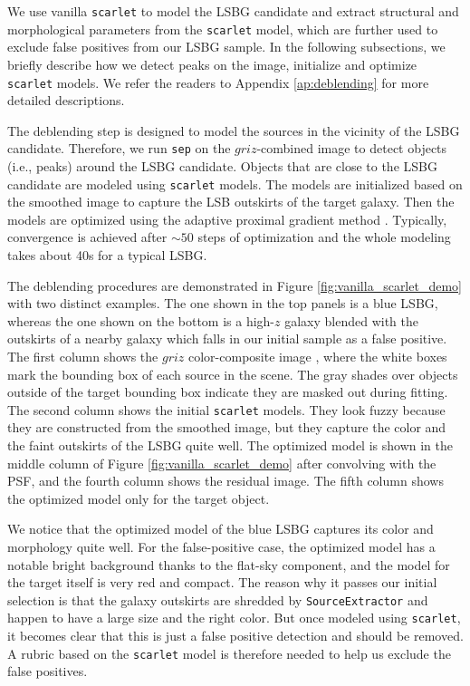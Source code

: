 \documentclass[twocolumn,astrosymb,twocolappendix]{aastex631}
\newcommand{\code}[1]{\texttt{#1}}
\begin{document}
\begin{CJK*}{UTF8}{gbsn}
We use vanilla \code{scarlet} to model the LSBG candidate and extract structural and morphological parameters from the \code{scarlet} model, which are further used to exclude false positives from our LSBG sample. In the following subsections, we briefly describe how we detect peaks on the image, initialize and optimize \code{scarlet} models. We refer the readers to Appendix \ref{ap:deblending} for more detailed descriptions. 

The deblending step is designed to model the sources in the vicinity of the LSBG candidate. Therefore, we run \code{sep} on the $griz$-combined image to detect objects (i.e., peaks) around the LSBG candidate. Objects that are close to the LSBG candidate are modeled using \code{scarlet} models. The models are initialized based on the smoothed image to capture the LSB outskirts of the target galaxy. Then the models are optimized using the adaptive proximal gradient method \citep{Melchior2019}. Typically, convergence is achieved after $\sim 50$ steps of optimization and the whole modeling takes about 40s for a typical LSBG.

The deblending procedures are demonstrated in Figure \ref{fig:vanilla_scarlet_demo} with two distinct examples. The one shown in the top panels is a blue LSBG, whereas the one shown on the bottom is a high-$z$ galaxy blended with the outskirts of a nearby galaxy which falls in our initial sample as a false positive. The first column shows the $griz$ color-composite image \citep{Lupton2004}, where the white boxes mark the bounding box of each source in the scene. The gray shades over objects outside of the target bounding box indicate they are masked out during fitting. The second column shows the initial \code{scarlet} models. They look fuzzy because they are constructed from the smoothed image, but they capture the color and the faint outskirts of the LSBG quite well. The optimized model is shown in the middle column of Figure \ref{fig:vanilla_scarlet_demo} after convolving with the PSF, and the fourth column shows the residual image. The fifth column shows the optimized model only for the target object. 

We notice that the optimized model of the blue LSBG captures its color and morphology quite well. For the false-positive case, the optimized model has a notable bright background thanks to the flat-sky component, and the model for the target itself is very red and compact. The reason why it passes our initial selection is that the galaxy outskirts are shredded by \code{SourceExtractor} and happen to have a large size and the right color. But once modeled using \code{scarlet}, it becomes clear that this is just a false positive detection and should be removed. A rubric based on the \code{scarlet} model is therefore needed to help us exclude the false positives. 


\end{CJK*}
\end{document}
